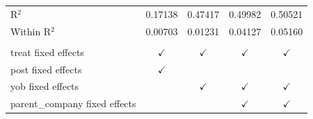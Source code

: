 \begin{table}[htbp]
\begin{tabular}{lcccc}
      R$^2$                          & 0.17138       & 0.47417       & 0.49982       & 0.50521\\  
      Within R$^2$                   & 0.00703       & 0.01231       & 0.04127       & 0.05160\\  
       \\
      treat fixed effects            & $\checkmark$  & $\checkmark$  & $\checkmark$  & $\checkmark$\\   
      post fixed effects             & $\checkmark$  &               &               & \\  
      yob fixed effects              &               & $\checkmark$  & $\checkmark$  & $\checkmark$\\   
      parent\_company fixed effects  &               &               & $\checkmark$  & $\checkmark$\\   
      \bottomrule
   \end{tabular}
\end{table}


